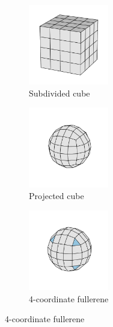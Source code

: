 \begin{figure}[bt]
     \vspace{0.2cm}
     \begin{subfigure}[b]{0.3\textwidth}
         \centering
         \includegraphics[height=3.5cm]{./figures/general_networks/full98_iso.pdf}
         \caption{Subdivided cube}
         \label{fig:topo4}
     \end{subfigure}
     \hfill
     \begin{subfigure}[b]{0.3\textwidth}
         \centering
         \includegraphics[height=3.5cm]{./figures/general_networks/full98_iso_min.pdf}
         \caption{Projected cube}
         \label{fig:topo5}
     \end{subfigure}
     \hfill
     \begin{subfigure}[b]{0.3\textwidth}
         \centering
         \includegraphics[height=3.5cm]{./figures/general_networks/full98.pdf}
         \caption{4\--coordinate fullerene}
         \label{fig:topo6}
     \end{subfigure}
     \hfill
     

\end{figure}
